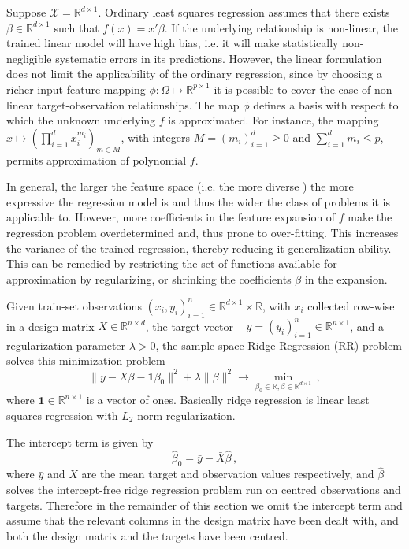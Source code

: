 \documentclass[a4paper,14pt]{extarticle}
\newcommand{\Xcal}{\mathcal{X}}
\newcommand{\Real}{\mathbb{R}}
\newcommand{\one}{\mathbf{1}}
\begin{document}
Suppose $\Xcal = \Real^{d\times 1}$. Ordinary least squares regression assumes that
there exists $\beta\in \Real^{d\times 1}$ such that $f(x) = x'\beta$. If the underlying
relationship is non-linear, the trained linear model will have high bias, i.e.
it will make statistically non-negligible systematic errors in its predictions.
However, the linear formulation does not limit the applicability of the ordinary
regression, since by choosing a richer input-feature mapping $\phi: \Omega \mapsto
\Real^{p\times 1}$ it is possible to cover the case of non-linear target-observation
relationships. The map $\phi$ defines a basis with respect to which the unknown
underlying $f$ is approximated. For instance, the mapping $x\mapsto (\prod_{i=1}^d
x_i^{m_i})_{m\in M}$, with integers $M=(m_i)_{i=1}^d\geq 0$ and $\sum_{i=1}^d m_i \leq p$,
permits approximation of polynomial $f$.

In general, the larger the feature space (i.e. the more diverse ) the more expressive
the regression model is and thus the wider the class of problems it is applicable
to. However, more coefficients in the feature expansion of $f$ make the regression
problem overdetermined and, thus prone to over-fitting. This increases the variance
of the trained regression, thereby reducing it generalization ability. This can be
remedied by restricting the set of functions available for approximation by regularizing,
or shrinking the coefficients $\beta$ in the expansion.

Given train-set observations $(x_i, y_i)_{i=1}^n \in \Real^{d\times 1}\times \Real$,
with $x_i$ collected row-wise in a design matrix $X\in \Real^{n\times d}$, the target
vector -- $y=(y_i)_{i=1}^n \in \Real^{n\times 1}$, and a regularization parameter
$\lambda > 0$, the sample-space Ridge Regression (RR) problem solves this minimization
problem
\begin{equation}
  \| y - X\beta - \one\beta_0 \|^2 + \lambda \|\beta\|^2
    \to \min_{\beta_0\in \Real, \beta \in \Real^{d\times 1}} \,,
\end{equation}
where $\one \in \Real^{n\times 1}$ is a vector of ones. Basically ridge regression
is linear least squares regression with $L_2$-norm regularization.

The intercept term is given by
\begin{equation}
  \hat{\beta}_0 = \bar{y} - \bar{X} \hat{\beta} \,,
\end{equation}
where $\bar{y}$ and $\bar{X}$ are the mean target and observation values respectively,
and $\hat{\beta}$ solves the intercept-free ridge regression problem run on centred
observations and targets. Therefore in the remainder of this section we omit the intercept
term and assume that the relevant columns in the design matrix have been dealt with,
and both the design matrix and the targets have been centred.
\end{document}
